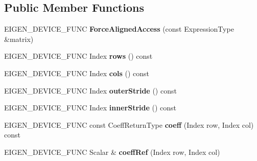 \subsection*{Public Member Functions}
\begin{DoxyCompactItemize}
\item 
\mbox{\label{class_eigen_1_1_force_aligned_access_a154c0fa31a48ac44675adf4bf3c1936d}} 
E\+I\+G\+E\+N\+\_\+\+D\+E\+V\+I\+C\+E\+\_\+\+F\+U\+NC {\bfseries Force\+Aligned\+Access} (const Expression\+Type \&matrix)
\item 
\mbox{\label{class_eigen_1_1_force_aligned_access_a111e76fdf776c5809030d96b94982fde}} 
E\+I\+G\+E\+N\+\_\+\+D\+E\+V\+I\+C\+E\+\_\+\+F\+U\+NC Index {\bfseries rows} () const
\item 
\mbox{\label{class_eigen_1_1_force_aligned_access_adf9b0bc1f93ea10c9b97d55f83bec576}} 
E\+I\+G\+E\+N\+\_\+\+D\+E\+V\+I\+C\+E\+\_\+\+F\+U\+NC Index {\bfseries cols} () const
\item 
\mbox{\label{class_eigen_1_1_force_aligned_access_a0b98054ef784a6d3e6010315bb4f09f4}} 
E\+I\+G\+E\+N\+\_\+\+D\+E\+V\+I\+C\+E\+\_\+\+F\+U\+NC Index {\bfseries outer\+Stride} () const
\item 
\mbox{\label{class_eigen_1_1_force_aligned_access_a4e3ecdb1a214e427f7977bf7fddb6f4f}} 
E\+I\+G\+E\+N\+\_\+\+D\+E\+V\+I\+C\+E\+\_\+\+F\+U\+NC Index {\bfseries inner\+Stride} () const
\item 
\mbox{\label{class_eigen_1_1_force_aligned_access_a6afd2c0cc0c91388142ea7c152daf1bd}} 
E\+I\+G\+E\+N\+\_\+\+D\+E\+V\+I\+C\+E\+\_\+\+F\+U\+NC const Coeff\+Return\+Type {\bfseries coeff} (Index row, Index col) const
\item 
\mbox{\label{class_eigen_1_1_force_aligned_access_a129676e5a79ef7b741fef6a5a05ba775}} 
E\+I\+G\+E\+N\+\_\+\+D\+E\+V\+I\+C\+E\+\_\+\+F\+U\+NC Scalar \& {\bfseries coeff\+Ref} (Index row, Index col)
\item 
\mbox{\label{class_eigen_1_1_force_aligned_access_abdb06f5cc3ffe4bc5961628deaf6393b}} 

\end{DoxyCompactItemize}
